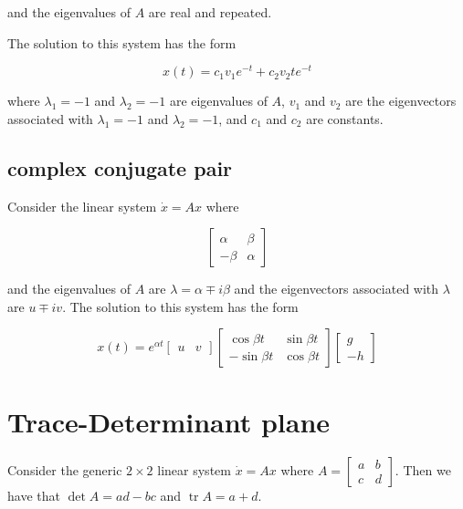 \documentclass[12pt]{article}
\theoremstyle{definition}
\newcommand\tr{\mathop{\mathrm{tr}}}
\begin{document}
and the eigenvalues of $A$ are real and repeated.

The solution to this system has the form

\begin{equation*}
x(t) = c_1 v_1 e^{-t} + c_2 v_2 t e^{-t}
\end{equation*}

where $\lambda_1 = -1$ and $\lambda_2 = -1$ are eigenvalues of $A$, $v_1$ and $v_2$ are the eigenvectors associated with $\lambda_1 = -1$ and $\lambda_2 = -1$, and $c_1$ and $c_2$ are constants.

\subsection{complex conjugate pair}

Consider the linear system $\dot x = A x$ where

\begin{equation*}
\begin{bmatrix}
\alpha & \beta \\
-\beta & \alpha
\end{bmatrix}
\end{equation*}

and the eigenvalues of $A$ are $\lambda = \alpha \mp i\beta$ and the eigenvectors associated with $\lambda$ are $u \mp iv$.
The solution to this system has the form

\begin{equation*}
x(t) = e^{\alpha t} 
\begin{bmatrix}
u & v
\end{bmatrix}
\begin{bmatrix}
\cos \beta t & \sin \beta t \\
-\sin \beta t & \cos \beta t
\end{bmatrix}
\begin{bmatrix}
g \\
-h
\end{bmatrix}
\end{equation*}

\section{Trace-Determinant plane}

Consider the generic $2 \times 2$ linear system $\dot x = Ax$ where $A = \begin{bmatrix} a & b \\ c & d \end{bmatrix}$. Then we have that $\det A = ad - bc$ and $\tr A = a + d$.
\end{document}

